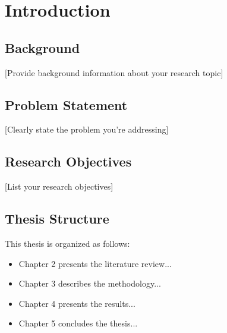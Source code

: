 \chapter{Introduction}

\section{Background}
[Provide background information about your research topic]

\section{Problem Statement}
[Clearly state the problem you're addressing]

\section{Research Objectives}
[List your research objectives]

\section{Thesis Structure}
This thesis is organized as follows:
\begin{itemize}
    \item Chapter 2 presents the literature review...
    \item Chapter 3 describes the methodology...
    \item Chapter 4 presents the results...
    \item Chapter 5 concludes the thesis...
\end{itemize} 